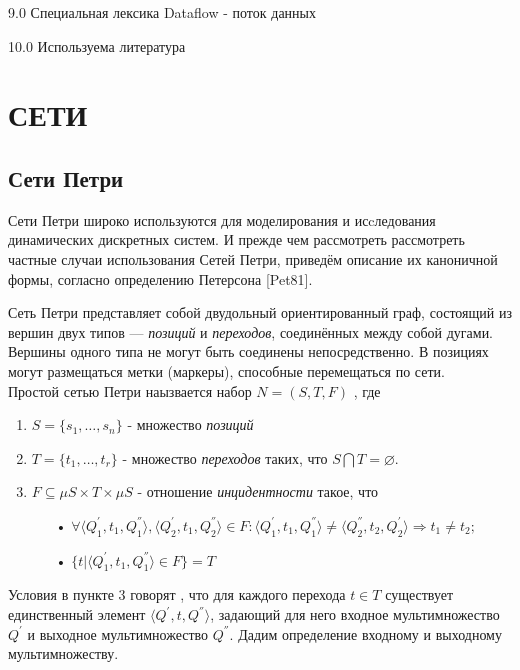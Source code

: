 \documentclass[a4paper,14pt]{article}
\begin{document}
9.0  Специальная лексика
 Dataflow - поток данных 


10.0 Используема литература

\section{СЕТИ}
\subsection{Сети Петри}
Сети Петри широко используются для моделирования и исcледования динамических дискретных систем. 
И прежде чем рассмотреть рассмотреть частные случаи использования Сетей Петри, приведём описание их каноничной формы, согласно определению Петерсона [Pet81].
\par Сеть Петри представляет собой двудольный ориентированный граф, состоящий из вершин двух типов — \textit{позиций} и \textit{переходов}, соединённых между собой дугами. Вершины одного типа не могут быть соединены непосредственно. В позициях могут размещаться метки (маркеры), способные перемещаться по сети.\\
Простой сетью Петри наызвается набор $N = (S,T,F)$ , где
\begin{enumerate}
\item $S = \lbrace s_{1},\ldots,s_{n} \rbrace$ - множество \textit{позиций}
\item $T = \lbrace t_{1},\ldots,t_{r} \rbrace$ - множество \textit{переходов} таких, что $S \bigcap T = \varnothing$.
\item $F \subseteq \mu S \times T \times \mu S$ - отношение \textit{инцидентности} такое, что 
\begin{enumerate}
\item[•] $\forall \langle  Q_{1}^{'}, t_{1}, Q_{1}^{''} \rangle , \langle Q_{2}^{'}, t_{1}, Q_{2}^{''}\rangle \in F : \langle Q_{1}^{'}, t_{1}, Q_{1}^{''} \rangle \neq \langle Q_{2}^{''}, t_{2}, Q_{2}^{'}\rangle \Rightarrow t_{1} \neq t_{2};$
\item[•] $\lbrace t | \langle  Q_{1}^{'}, t_{1}, Q_{1}^{''} \rangle \in F \rbrace = T$
\end{enumerate}
\end{enumerate} 
Условия в пункте 3 говорят , что для каждого перехода $t \in T$ существует единственный элемент $\langle Q^{'}, t, Q^{''} \rangle$, задающий для него входное мультимножество $Q^{'}$ и  выходное мультимножество $Q^{''}$. Дадим определение входному и выходному мультимножеству.
\end{document}
